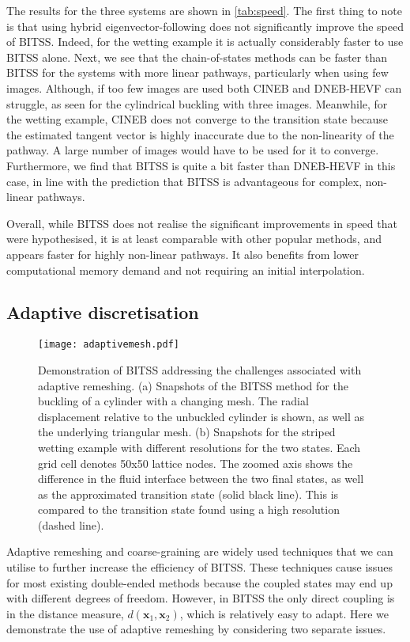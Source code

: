 \documentclass[aip,jcp,reprint,twocolumn]{revtex4-1}
\begin{document}
The results for the three systems are shown in \cref{tab:speed}.
The first thing to note is that using hybrid eigenvector-following does not significantly improve the speed of BITSS.
Indeed, for the wetting example it is actually considerably faster to use BITSS alone.
Next, we see that the chain-of-states methods can be faster than BITSS for the systems with more linear pathways, particularly when using few images.
Although, if too few images are used both CINEB and DNEB-HEVF can struggle, as seen for the cylindrical buckling with three images.
Meanwhile, for the wetting example, CINEB does not converge to the transition state because the estimated tangent vector is highly inaccurate due to the non-linearity of the pathway.
A large number of images would have to be used for it to converge.
Furthermore, we find that BITSS is quite a bit faster than DNEB-HEVF in this case, in line with the prediction that BITSS is advantageous for complex, non-linear pathways.

Overall, while BITSS does not realise the significant improvements in speed that were hypothesised, it is at least comparable with other popular methods, and appears faster for highly non-linear pathways.
It also benefits from lower computational memory demand and not requiring an initial interpolation.


\subsection{Adaptive discretisation}\label{sec:adaptive}
\begin{figure}[tb]
  \texttt{[image: adaptivemesh.pdf]}
  \caption{\label{fig:adaptivemesh}
    Demonstration of BITSS addressing the challenges associated with adaptive remeshing.
    (a) Snapshots of the BITSS method for the buckling of a cylinder with a changing mesh.
        The radial displacement relative to the unbuckled cylinder is shown, as well as the underlying triangular mesh.
    (b) Snapshots for the striped wetting example with different resolutions for the two states.
        Each grid cell denotes 50x50 lattice nodes.
        The zoomed axis shows the difference in the fluid interface between the two final states, as well as the approximated transition state (solid black line).
        This is compared to the transition state found using a high resolution (dashed line).
  }
\end{figure}

Adaptive remeshing and coarse-graining are widely used techniques that we can utilise to further increase the efficiency of BITSS.
These techniques cause issues for most existing double-ended methods because the coupled states may end up with different degrees of freedom.
However, in BITSS the only direct coupling is in the distance measure, $d(\bm{x}_1,\bm{x}_2)$, which is relatively easy to adapt.
Here we demonstrate the use of adaptive remeshing by considering two separate issues.
\end{document}
